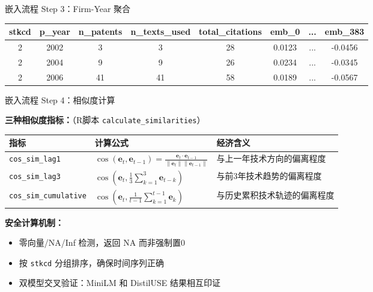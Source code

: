 \documentclass[aspectratio=169]{beamer}
\begin{document}
\begin{frame}{嵌入流程 Step 3：Firm-Year 聚合}
\begin{center}
\small
\begin{tabular}{cccccccc}
\toprule
\textbf{stkcd} & \textbf{p\_year} & \textbf{n\_patents} & \textbf{n\_texts\_used} & \textbf{total\_citations} & \textbf{emb\_0} & \textbf{...} & \textbf{emb\_383} \\
\midrule
2 & 2002 & 3 & 3 & 28 & 0.0123 & ... & -0.0456 \\
2 & 2004 & 9 & 9 & 26 & 0.0234 & ... & -0.0345 \\
2 & 2006 & 41 & 41 & 58 & 0.0189 & ... & -0.0567 \\
\bottomrule
\end{tabular}
\end{center}

\end{frame}

\begin{frame}{嵌入流程 Step 4：相似度计算}

\textbf{三种相似度指标：}（R脚本 \texttt{calculate\_similarities}）

\vspace{0.3cm}

\begin{center}
\begin{tabular}{p{3cm}p{6cm}p{4cm}}
\toprule
\textbf{指标} & \textbf{计算公式} & \textbf{经济含义} \\
\midrule
\texttt{cos\_sim\_lag1} & 
$\cos(\mathbf{e}_t, \mathbf{e}_{t-1}) = \frac{\mathbf{e}_t \cdot \mathbf{e}_{t-1}}{\|\mathbf{e}_t\| \|\mathbf{e}_{t-1}\|}$ & 
与上一年技术方向的偏离程度 \\
\midrule
\texttt{cos\_sim\_lag3} & 
$\cos\left(\mathbf{e}_t, \frac{1}{3}\sum_{k=1}^3 \mathbf{e}_{t-k}\right)$ & 
与前3年技术趋势的偏离程度 \\
\midrule
\texttt{cos\_sim\_cumulative} & 
$\cos\left(\mathbf{e}_t, \frac{1}{t-1}\sum_{k=1}^{t-1} \mathbf{e}_k\right)$ & 
与历史累积技术轨迹的偏离程度 \\
\bottomrule
\end{tabular}
\end{center}

\vspace{0.4cm}

\textbf{安全计算机制：}
\begin{itemize}
    \item 零向量/NA/Inf 检测，返回 NA 而非强制置0
    \item 按 \texttt{stkcd} 分组排序，确保时间序列正确
    \item 双模型交叉验证：MiniLM 和 DistilUSE 结果相互印证
\end{itemize}

\end{frame}
\end{document}
